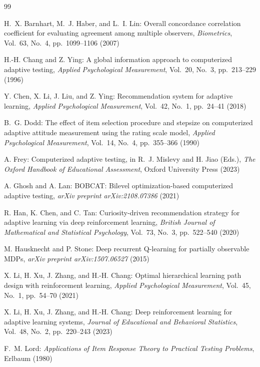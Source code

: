 \documentclass[dvipdfmx,a4j]{jarticle}
\begin{document}
\begin{thebibliography}{99}

H.~X. Barnhart, M.~J. Haber, and L.~I. Lin:
Overall concordance correlation coefficient for evaluating agreement among multiple observers,
\textit{Biometrics}, Vol.~63, No.~4, pp.~1099--1106 (2007)

H.-H. Chang and Z. Ying:
A global information approach to computerized adaptive testing,
\textit{Applied Psychological Measurement}, Vol.~20, No.~3, pp.~213--229 (1996)

Y. Chen, X. Li, J. Liu, and Z. Ying:
Recommendation system for adaptive learning,
\textit{Applied Psychological Measurement}, Vol.~42, No.~1, pp.~24--41 (2018)

B.~G. Dodd:
The effect of item selection procedure and stepsize on computerized adaptive attitude measurement using the rating scale model,
\textit{Applied Psychological Measurement}, Vol.~14, No.~4, pp.~355--366 (1990)

A. Frey:
Computerized adaptive testing,
in R.~J. Mislevy and H. Jiao (Eds.),
\textit{The Oxford Handbook of Educational Assessment},
Oxford University Press (2023)

A. Ghosh and A. Lan:
BOBCAT: Bilevel optimization-based computerized adaptive testing,
\textit{arXiv preprint arXiv:2108.07386} (2021)

R. Han, K. Chen, and C. Tan:
Curiosity-driven recommendation strategy for adaptive learning via deep reinforcement learning,
\textit{British Journal of Mathematical and Statistical Psychology},
Vol.~73, No.~3, pp.~522--540 (2020)

M. Hausknecht and P. Stone:
Deep recurrent Q-learning for partially observable MDPs,
\textit{arXiv preprint arXiv:1507.06527} (2015)

X. Li, H. Xu, J. Zhang, and H.-H. Chang:
Optimal hierarchical learning path design with reinforcement learning,
\textit{Applied Psychological Measurement}, Vol.~45, No.~1, pp.~54--70 (2021)

X. Li, H. Xu, J. Zhang, and H.-H. Chang:
Deep reinforcement learning for adaptive learning systems,
\textit{Journal of Educational and Behavioral Statistics},
Vol.~48, No.~2, pp.~220--243 (2023)

F.~M. Lord:
\textit{Applications of Item Response Theory to Practical Testing Problems},
Erlbaum (1980)


\end{thebibliography}
\end{document}
